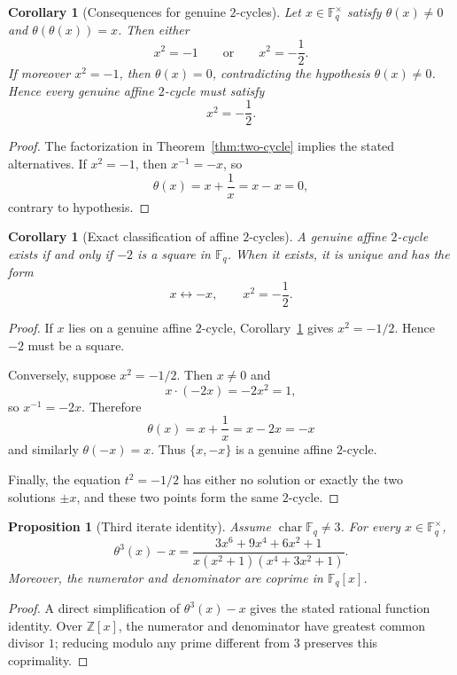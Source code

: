 \documentclass[11pt]{article}
\newtheorem{proposition}[theorem]{Proposition}
\newtheorem{corollary}[theorem]{Corollary}
\newcommand{\F}{\mathbb{F}}
\begin{document}
\begin{corollary}[Consequences for genuine $2$-cycles]
\label{cor:two-cycle}
Let $x\in\F_q^\times$ satisfy $\theta(x)\neq 0$ and $\theta(\theta(x))=x$.
Then either
\[
x^2=-1
\qquad\text{or}\qquad
x^2=-\frac12.
\]
If moreover $x^2=-1$, then $\theta(x)=0$, contradicting the hypothesis $\theta(x)\neq0$.
Hence every genuine affine $2$-cycle must satisfy
\[
x^2=-\frac12.
\]
\end{corollary}

\begin{proof}
The factorization in Theorem~\ref{thm:two-cycle} implies the stated alternatives.
If $x^2=-1$, then $x^{-1}=-x$, so
\[
\theta(x)=x+\frac1x=x-x=0,
\]
contrary to hypothesis.
\end{proof}

\begin{corollary}[Exact classification of affine $2$-cycles]
\label{cor:two-cycle-classification}
A genuine affine $2$-cycle exists if and only if $-2$ is a square in $\F_q$.
When it exists, it is unique and has the form
\[
x\longleftrightarrow -x,
\qquad x^2=-\frac12.
\]
\end{corollary}

\begin{proof}
If $x$ lies on a genuine affine $2$-cycle, Corollary~\ref{cor:two-cycle} gives $x^2=-1/2$.
Hence $-2$ must be a square.

Conversely, suppose $x^2=-1/2$.
Then $x\neq 0$ and
\[
x\cdot(-2x)=-2x^2=1,
\]
so $x^{-1}=-2x$.
Therefore
\[
\theta(x)=x+\frac1x=x-2x=-x
\]
and similarly $\theta(-x)=x$.
Thus $\{x,-x\}$ is a genuine affine $2$-cycle.

Finally, the equation $t^2=-1/2$ has either no solution or exactly the two solutions $\pm x$, and these two points form the same $2$-cycle.
\end{proof}

\begin{proposition}[Third iterate identity]
\label{prop:third-iterate}
Assume $\operatorname{char}\F_q\neq 3$.
For every $x\in\F_q^\times$,
\[
\theta^3(x)-x
=
\frac{3x^6+9x^4+6x^2+1}{x(x^2+1)(x^4+3x^2+1)}.
\]
Moreover, the numerator and denominator are coprime in $\F_q[x]$.
\end{proposition}

\begin{proof}
A direct simplification of $\theta^3(x)-x$ gives the stated rational function identity.
Over $\mathbb{Z}[x]$, the numerator and denominator have greatest common divisor $1$; reducing modulo any prime different from $3$ preserves this coprimality.
\end{proof}
\end{document}
